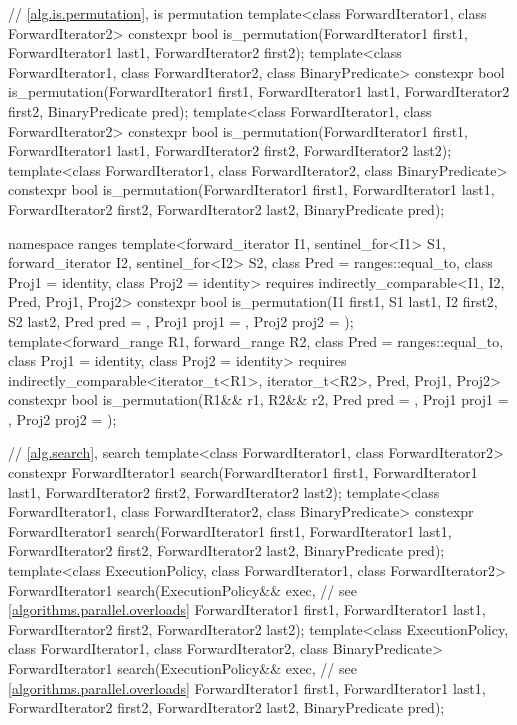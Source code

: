 \begin{codeblock}
{  // \ref{alg.is.permutation}, is permutation
  template<class ForwardIterator1, class ForwardIterator2>
    constexpr bool is_permutation(ForwardIterator1 first1, ForwardIterator1 last1,
                                  ForwardIterator2 first2);
  template<class ForwardIterator1, class ForwardIterator2, class BinaryPredicate>
    constexpr bool is_permutation(ForwardIterator1 first1, ForwardIterator1 last1,
                                  ForwardIterator2 first2, BinaryPredicate pred);
  template<class ForwardIterator1, class ForwardIterator2>
    constexpr bool is_permutation(ForwardIterator1 first1, ForwardIterator1 last1,
                                  ForwardIterator2 first2, ForwardIterator2 last2);
  template<class ForwardIterator1, class ForwardIterator2, class BinaryPredicate>
    constexpr bool is_permutation(ForwardIterator1 first1, ForwardIterator1 last1,
                                  ForwardIterator2 first2, ForwardIterator2 last2,
                                  BinaryPredicate pred);

  namespace ranges {
    template<forward_iterator I1, sentinel_for<I1> S1, forward_iterator I2,
             sentinel_for<I2> S2, class Pred = ranges::equal_to, class Proj1 = identity,
             class Proj2 = identity>
      requires indirectly_comparable<I1, I2, Pred, Proj1, Proj2>
      constexpr bool is_permutation(I1 first1, S1 last1, I2 first2, S2 last2,
                                    Pred pred = {},
                                    Proj1 proj1 = {}, Proj2 proj2 = {});
    template<forward_range R1, forward_range R2, class Pred = ranges::equal_to,
             class Proj1 = identity, class Proj2 = identity>
      requires indirectly_comparable<iterator_t<R1>, iterator_t<R2>, Pred, Proj1, Proj2>
      constexpr bool is_permutation(R1&& r1, R2&& r2, Pred pred = {},
                                    Proj1 proj1 = {}, Proj2 proj2 = {});
  }

  // \ref{alg.search}, search
  template<class ForwardIterator1, class ForwardIterator2>
    constexpr ForwardIterator1
      search(ForwardIterator1 first1, ForwardIterator1 last1,
             ForwardIterator2 first2, ForwardIterator2 last2);
  template<class ForwardIterator1, class ForwardIterator2, class BinaryPredicate>
    constexpr ForwardIterator1
      search(ForwardIterator1 first1, ForwardIterator1 last1,
             ForwardIterator2 first2, ForwardIterator2 last2,
             BinaryPredicate pred);
  template<class ExecutionPolicy, class ForwardIterator1, class ForwardIterator2>
    ForwardIterator1
      search(ExecutionPolicy&& exec,                            // see \ref{algorithms.parallel.overloads}
             ForwardIterator1 first1, ForwardIterator1 last1,
             ForwardIterator2 first2, ForwardIterator2 last2);
  template<class ExecutionPolicy, class ForwardIterator1, class ForwardIterator2,
           class BinaryPredicate>
    ForwardIterator1
      search(ExecutionPolicy&& exec,                            // see \ref{algorithms.parallel.overloads}
             ForwardIterator1 first1, ForwardIterator1 last1,
             ForwardIterator2 first2, ForwardIterator2 last2,
             BinaryPredicate pred);

}
\end{codeblock}
